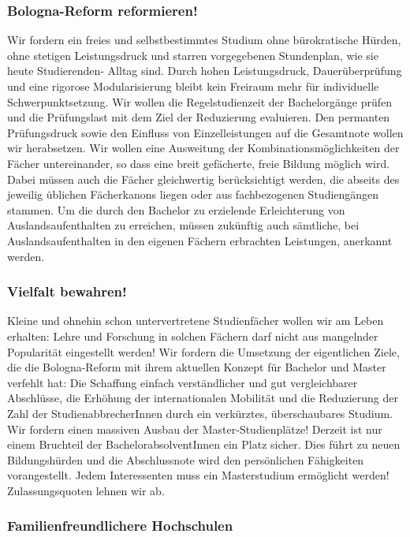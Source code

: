 \subsubsection{Bologna-Reform reformieren!}
\abstimmung
Wir fordern ein freies und selbstbestimmtes Studium ohne bürokratische Hürden, ohne stetigen Leistungsdruck und starren vorgegebenen Stundenplan, wie sie heute Studierenden- Alltag sind. Durch hohen Leistungsdruck, Dauerüberprüfung und eine rigorose Modularisierung bleibt kein Freiraum mehr für individuelle Schwerpunktsetzung. Wir wollen die Regelstudienzeit der Bachelorgänge prüfen und die Prüfungslast mit dem Ziel der Reduzierung evaluieren. Den permanten Prüfungsdruck sowie den Einfluss von Einzelleistungen auf die Gesamtnote wollen wir herabsetzen. Wir wollen eine Ausweitung der Kombinationsmöglichkeiten der Fächer untereinander, so dass eine breit gefächerte, freie Bildung möglich wird. Dabei müssen auch die Fächer gleichwertig berücksichtigt werden, die abseits des jeweilig üblichen Fächerkanons liegen oder aus fachbezogenen Studiengängen stammen. Um die durch den Bachelor zu erzielende Erleichterung von Auslandsaufenthalten zu erreichen, müssen zukünftig auch sämtliche, bei Auslandsaufenthalten in den eigenen Fächern erbrachten Leistungen, anerkannt werden.

\subsubsection{Vielfalt bewahren!}
\abstimmung
Kleine und ohnehin schon untervertretene Studienfächer wollen wir am Leben erhalten: Lehre und Forschung in solchen Fächern darf nicht aus mangelnder Popularität eingestellt werden! Wir fordern die Umsetzung der eigentlichen Ziele, die die Bologna-Reform mit ihrem aktuellen Konzept für Bachelor und Master verfehlt hat: Die Schaffung einfach verständlicher und gut vergleichbarer Abschlüsse, die Erhöhung der internationalen Mobilität und die Reduzierung der Zahl der StudienabbrecherInnen durch ein verkürztes, überschaubares Studium. Wir fordern einen massiven Ausbau der Master-Studienplätze! Derzeit ist nur einem Bruchteil der BachelorabsolventInnen ein Platz sicher. Dies führt zu neuen Bildungshürden und die Abschlussnote wird den persönlichen Fähigkeiten vorangestellt. Jedem Interessenten muss ein Masterstudium ermöglicht werden! Zulassungsquoten lehnen wir ab.
 
\subsubsection{Familienfreundlichere Hochschulen}

